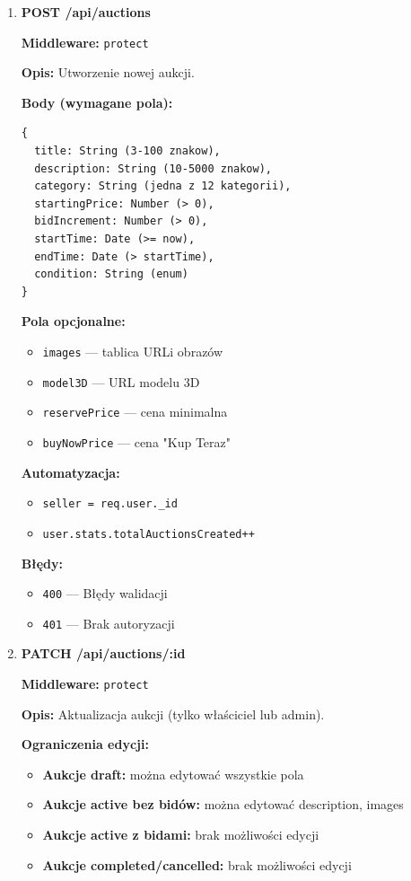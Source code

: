 \begin{enumerate}
  \item \textbf{POST /api/auctions}

        \textbf{Middleware:} \texttt{protect}

        \textbf{Opis:} Utworzenie nowej aukcji.

        \textbf{Body (wymagane pola):}
        \begin{lstlisting}
{
  title: String (3-100 znakow),
  description: String (10-5000 znakow),
  category: String (jedna z 12 kategorii),
  startingPrice: Number (> 0),
  bidIncrement: Number (> 0),
  startTime: Date (>= now),
  endTime: Date (> startTime),
  condition: String (enum)
}
\end{lstlisting}

        \textbf{Pola opcjonalne:}
        \begin{itemize}
          \item \texttt{images} --- tablica URLi obrazów
          \item \texttt{model3D} --- URL modelu 3D
          \item \texttt{reservePrice} --- cena minimalna
          \item \texttt{buyNowPrice} --- cena "Kup Teraz"
        \end{itemize}

        \textbf{Automatyzacja:}
        \begin{itemize}
          \item \texttt{seller = req.user.\_id}
          \item \texttt{user.stats.totalAuctionsCreated++}
        \end{itemize}

        \textbf{Błędy:}
        \begin{itemize}
          \item \texttt{400} --- Błędy walidacji
          \item \texttt{401} --- Brak autoryzacji
        \end{itemize}

  \item \textbf{PATCH /api/auctions/:id}

        \textbf{Middleware:} \texttt{protect}

        \textbf{Opis:} Aktualizacja aukcji (tylko właściciel lub admin).

        \textbf{Ograniczenia edycji:}
        \begin{itemize}
          \item \textbf{Aukcje draft:} można edytować wszystkie pola
          \item \textbf{Aukcje active bez bidów:} można edytować description, images
          \item \textbf{Aukcje active z bidami:} brak możliwości edycji
          \item \textbf{Aukcje completed/cancelled:} brak możliwości edycji
        \end{itemize}


\end{enumerate}
